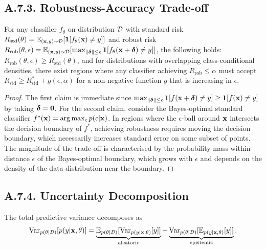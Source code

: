 \subsection*{A.7.3. Robustness-Accuracy Trade-off}
\label{app:robustness_tradeoff}

\begin{proposition}
\label{prop:ra_tradeoff}
For any classifier $f_\theta$ on distribution $\mathcal{D}$ with standard risk $R_{\mathrm{std}}(\theta) = \mathbb{E}_{(\mathbf{x},y)\sim\mathcal{D}}[\mathbf{1}[f_\theta(\mathbf{x})\neq y]]$ and robust risk $R_{\mathrm{rob}}(\theta,\epsilon) = \mathbb{E}_{(\mathbf{x},y)\sim\mathcal{D}}[\max_{\|\boldsymbol{\delta}\|\le\epsilon}\mathbf{1}[f_\theta(\mathbf{x}+\boldsymbol{\delta})\neq y]]$, the following holds: $R_{\mathrm{rob}}(\theta,\epsilon)\ge R_{\mathrm{std}}(\theta)$, and for distributions with overlapping class-conditional densities, there exist regions where any classifier achieving $R_{\mathrm{rob}}\le\alpha$ must accept $R_{\mathrm{std}}\ge R_{\mathrm{std}}^* + g(\epsilon,\alpha)$ for a non-negative function $g$ that is increasing in $\epsilon$.
\end{proposition}

\begin{proof}
The first claim is immediate since $\max_{\|\boldsymbol{\delta}\|\le\epsilon}\mathbf{1}[f(\mathbf{x}+\boldsymbol{\delta})\neq y]\ge\mathbf{1}[f(\mathbf{x})\neq y]$ by taking $\boldsymbol{\delta}=\mathbf{0}$. For the second claim, consider the Bayes-optimal standard classifier $f^*(\mathbf{x}) = \arg\max_c p(c|\mathbf{x})$. In regions where the $\epsilon$-ball around $\mathbf{x}$ intersects the decision boundary of $f^*$, achieving robustness requires moving the decision boundary, which necessarily increases standard error on some subset of points. The magnitude of the trade-off is characterised by the probability mass within distance $\epsilon$ of the Bayes-optimal boundary, which grows with $\epsilon$ and depends on the density of the data distribution near the boundary.
\end{proof}


\subsection*{A.7.4. Uncertainty Decomposition}
\label{app:uncertainty_decomp}

\begin{proposition}
\label{prop:uncertainty}
The total predictive variance decomposes as
\begin{equation}
\mathrm{Var}_{p(\theta|\mathcal{D})}[p(y|\mathbf{x},\theta)]
= \underbrace{\mathbb{E}_{p(\theta|\mathcal{D})}[\mathrm{Var}_{p(y|\mathbf{x},\theta)}[y]]}_{\text{aleatoric}}
+ \underbrace{\mathrm{Var}_{p(\theta|\mathcal{D})}[\mathbb{E}_{p(y|\mathbf{x},\theta)}[y]]}_{\text{epistemic}}.
\end{equation}
\end{proposition}

